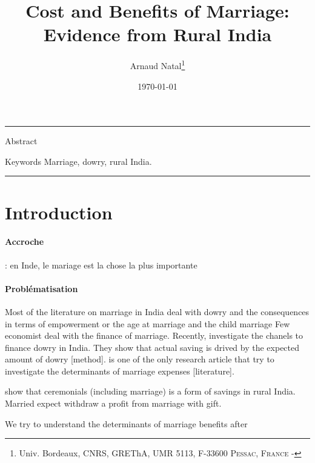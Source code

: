\documentclass[a4paper, 11pt, onecolumn]{article}
\title{Cost and Benefits of Marriage: Evidence from Rural India}
\author{Arnaud Natal\thanks{Univ. Bordeaux, CNRS, GREThA, UMR 5113, F-33600 \textsc{Pessac, France} - \email{arnaud.natal@u-bordeaux.fr}}}
\date{\today}
\begin{document}
\maketitle

\hrule 
\vspace{0.3cm}

\begin{resab}{Abstract}

\end{resab}

\begin{motkey}{Keywords}
Marriage, dowry, rural India.
\end{motkey}


\hrule

\section*{Introduction}
\label{section:introduction}
\paragraph{Accroche}
\cite{Dubois1825} : en Inde, le mariage est la chose la plus importante




\paragraph{Problématisation}

Most of the literature on marriage in India deal with dowry and the consequences in terms of empowerment \citep{Roy2015, Alfano2017, Srinivasan2007} or the age at marriage and the child marriage \citep{Vogl2013, Sheela2003}
Few economist deal with the finance of marriage.
Recently, \cite{Anukriti2020} investigate the chanels to finance dowry in India.
They show that actual saving is drived by the expected amount of dowry [method].
\cite{Bloch2004} is one of the only research article that try to investigate the determinants of marriage expenses [literature].

\cite{Guerin2020c} show that ceremonials (including marriage) is a form of savings in rural India.
Married expect withdraw a profit from marriage with gift.


We try to understand the determinants of marriage benefits after 
\end{document}
